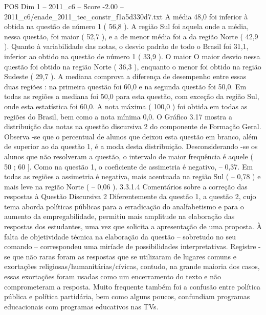 \begin{textsample}{POS Dim 1 – 2011\_c6 – Score -2.00 – 2011\_c6/enade\_2011\_tec\_constr\_f1a5d330d7.txt}
A média 48,0 foi inferior à obtida na questão de número 1 ( 56,8 ).
A região Sul foi aquela onde a média, nessa questão, foi maior ( 52,7 ), e a de menor média foi a da região Norte ( 42,9 ).
Quanto à variabilidade das notas, o desvio padrão de todo o Brasil foi 31,1, inferior ao obtido na questão de número 1 ( 33,9 ).
O maior O maior desvio nessa questão foi obtido na região Norte ( 36,3 ), enquanto o menor foi obtido na região Sudeste ( 29,7 ).
A mediana comprova a diferença de desempenho entre essas duas regiões : na primeira questão foi 60,0 e na segunda questão foi 50,0.
Em todas as regiões a mediana foi 50,0 para esta questão, com exceção da região Sul, onde esta estatística foi 60,0.
A nota máxima ( 100,0 ) foi obtida em todas as regiões do Brasil, bem como a nota mínima 0,0.
O Gráfico 3.17 mostra a distribuição das notas na questão discursiva 2 do componente de Formação Geral.
Observa -se que o percentual de alunos que deixou esta questão em branco, além de superior ao da questão 1, é a moda desta distribuição.
Desconsiderando -se os alunos que não resolveram a questão, o intervalo de maior frequência é aquele ( 50 ; 60 ].
Como na questão 1, o coeficiente de assimetria é negativo, – 0,37.
Em todas as regiões a assimetria é negativa, mais acentuada na região Sul ( – 0,78 ) e mais leve na região Norte ( – 0,06 ). 3.3.1.4 Comentários sobre a correção das respostas à Questão Discursiva 2 Diferentemente da questão 1, a questão 2, cujo tema aborda políticas públicas para a erradicação do analfabetismo e para o aumento da empregabilidade, permitiu mais amplitude na elaboração das respostas dos estudantes, uma vez que solicita a apresentação de uma proposta.
À falta de objetividade técnica na elaboração da questão – sobretudo no seu comando – correspondeu uma miríade de possibilidades interpretativas.
Registre -se que não raras foram as respostas que se utilizaram de lugares comuns e exortações religiosas/humanitárias/cívicas, contudo, na grande maioria dos casos, essas exortações foram usadas como um encerramento do texto e não comprometeram a resposta.
Muito frequente também foi a confusão entre política pública e política partidária, bem como alguns poucos, confundiam programas educacionais com programas educativos nas TVs.

\end{textsample}
